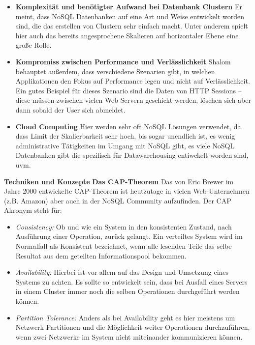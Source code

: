 \begin{itemize}
	\item \textbf{Komplexität und benötigter Aufwand bei Datenbank Clustern}\newline
	 Er meint, dass NoSQL Datenbanken auf eine Art und Weise entwickelt worden sind, die das erstellen von Clustern sehr einfach macht. Unter anderem spielt hier auch das bereits angesprochene Skalieren auf horizontaler Ebene eine große Rolle.
	
	\item \textbf{Kompromiss zwischen Performance und Verlässlichkeit}\newline
	 Shalom behauptet außerdem, dass verschiedene Szenarien gibt, in welchen Applikationen den Fokus auf Performance legen und nicht auf Verlässlichkeit. Ein gutes Beispiel für dieses Szenario sind die Daten von HTTP Sessions – diese müssen zwischen vielen Web Servern geschickt werden, löschen sich aber dann sobald der User sich abmeldet.

	\item \textbf{Cloud Computing}\newline
	 Hier werden sehr oft NoSQL Lösungen verwendet, da dass Limit der Skalierbarkeit sehr hoch, bis sogar unendlich ist, es wenig administrative Tätigkeiten im Umgang mit NoSQL gibt, es viele NoSQL Datenbanken gibt die spezifisch für Datawarehousing entiwckelt worden sind, uvm.
\end{itemize}

\textbf{Techniken und Konzepte\newline}
\htab\textbf{Das CAP-Theorem\newline}
Das von Eric Brewer im Jahre 2000 entwickelte CAP-Theorem ist heutzutage in vielen Web-Unternehmen (z.B. Amazon) aber auch in der NoSQL Community aufzufinden\cite{MELD.CH2-noSQL.capTheorem}. Der CAP Akronym steht für:

\begin{itemize}
	\item \textit{Consistency:} Ob und wie ein System in den konsistenten Zustand, nach Ausführung einer Operation, zurück gelangt. Ein verteiltes System wird im Normalfall als Konsistent bezeichnet, wenn alle lesenden Teile das selbe Resultat aus dem geteilten Informationspool bekommen.

	\item \textit{Availability:} Hierbei ist vor allem auf das Design und Umsetzung eines Systems zu achten. Es sollte so entwickelt sein, dass bei Ausfall eines Servers in einem Cluster immer noch die selben Operationen durchgeführt werden können.

	\item \textit{Partition Tolerance:} Anders als bei Availability geht es hier meistens um Netzwerk Partitionen und die Möglichkeit weiter Operationen durchzuführen, wenn zwei Netzwerke im System nicht miteinander kommunizieren können.
\end{itemize}

